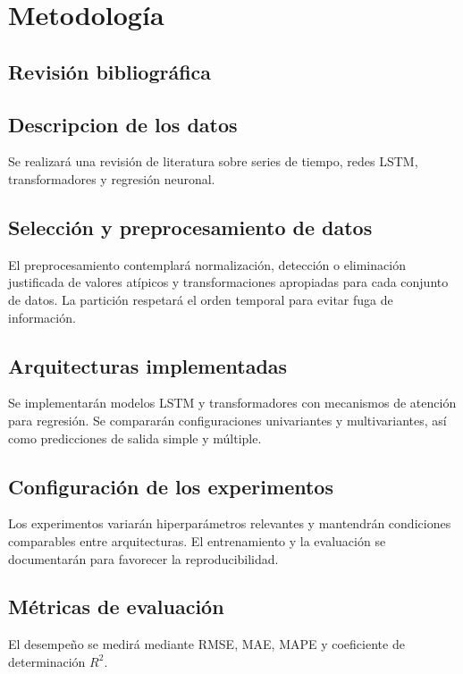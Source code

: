 \chapter{Metodología}

\section{Revisión bibliográfica}
\section{Descripcion de los datos}
Se realizará una revisión de literatura sobre series de tiempo, redes LSTM, transformadores y regresión neuronal.

\section{Selección y preprocesamiento de datos}

El preprocesamiento contemplará normalización, detección o eliminación justificada de valores atípicos y transformaciones apropiadas para cada conjunto de datos. La partición respetará el orden temporal para evitar fuga de información.

\section{Arquitecturas implementadas}

Se implementarán modelos LSTM y transformadores con mecanismos de atención para regresión. Se compararán configuraciones univariantes y multivariantes, así como predicciones de salida simple y múltiple.

\section{Configuración de los experimentos}

Los experimentos variarán hiperparámetros relevantes y mantendrán condiciones comparables entre arquitecturas. El entrenamiento y la evaluación se documentarán para favorecer la reproducibilidad.

\section{Métricas de evaluación}

El desempeño se medirá mediante RMSE, MAE, MAPE y coeficiente de determinación $R^2$.

